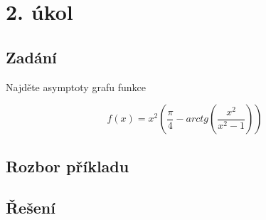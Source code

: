 \section{2. úkol}
\subsection{Zadání}

Najděte asymptoty grafu funkce 

\begin{displaymath}
f(x) = x^2(\frac{\pi}{4}-arctg(\frac{x^2}{x^2-1}))
\end{displaymath}

\subsection{Rozbor příkladu}
\subsection{Řešení}

